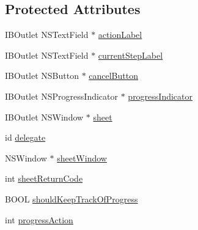 \subsection*{Protected Attributes}
\begin{DoxyCompactItemize}
\item 
I\-B\-Outlet N\-S\-Text\-Field $\ast$ \hyperlink{interface_m_b_threaded_progress_sheet_controller_aba2fcff18ed6fb08359e0feb4b7c151b}{action\-Label}
\item 
I\-B\-Outlet N\-S\-Text\-Field $\ast$ \hyperlink{interface_m_b_threaded_progress_sheet_controller_a08cfab5bfdfb138e74f42a9dac5b2f4c}{current\-Step\-Label}
\item 
I\-B\-Outlet N\-S\-Button $\ast$ \hyperlink{interface_m_b_threaded_progress_sheet_controller_ab09485e3991a253aee3ebf62680c718c}{cancel\-Button}
\item 
I\-B\-Outlet N\-S\-Progress\-Indicator $\ast$ \hyperlink{interface_m_b_threaded_progress_sheet_controller_a8d8847912bf02123b1ed3e8a70e6ed7e}{progress\-Indicator}
\item 
I\-B\-Outlet N\-S\-Window $\ast$ \hyperlink{interface_m_b_threaded_progress_sheet_controller_a8a035c449935de5ae26668f428a7a622}{sheet}
\item 
id \hyperlink{interface_m_b_threaded_progress_sheet_controller_a8d9332fcd23523b1e2520b8765577423}{delegate}
\item 
N\-S\-Window $\ast$ \hyperlink{interface_m_b_threaded_progress_sheet_controller_adbe1198d6acebb7aed9decaced6940c0}{sheet\-Window}
\item 
int \hyperlink{interface_m_b_threaded_progress_sheet_controller_acc507979f5b4a4d2b23f6d1a7d6c3fb1}{sheet\-Return\-Code}
\item 
B\-O\-O\-L \hyperlink{interface_m_b_threaded_progress_sheet_controller_a2d8f62873afd346e9b34a430bd725a3a}{should\-Keep\-Track\-Of\-Progress}
\item 
int \hyperlink{interface_m_b_threaded_progress_sheet_controller_aa059e7308aacf214367c5109801b5a1c}{progress\-Action}
\end{DoxyCompactItemize}


